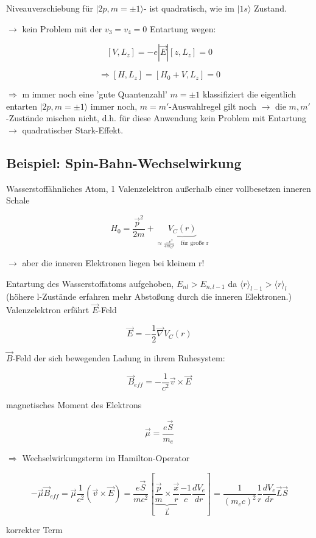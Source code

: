 Niveauverschiebung für \(|2p,m=\pm1\rangle\)- ist quadratisch, wie im \(|1s\rangle\) Zustand.


\(\rightarrow\) kein Problem mit der \(v_3=v_4=0\) Entartung wegen:

\[ [V,L_z] = -e|\vec E| [z,L_z] = 0\]

\[\Rightarrow [H,L_z] = [H_0+V,L_z]=0\]

\(\Rightarrow\) m immer noch eine 'gute Quantenzahl' \(m=\pm 1\) klassifiziert die eigentlich entarten \(|2p,m=\pm 1\rangle\) immer noch, \(m=m'\)-Auswahlregel gilt noch \(\rightarrow\) die \(m,m'\)-Zustände mischen nicht, d.h. für diese Anwendung kein Problem mit Entartung \(\rightarrow\) quadratischer Stark-Effekt.



\subsection{Beispiel: Spin-Bahn-Wechselwirkung}

Wasserstoffähnliches Atom, 1 Valenzelektron außerhalb einer vollbesetzen inneren Schale

\[ H_0= \frac{\vec p^2}{2m} + \underbrace{V_C(r)}_{\approx \frac{-e^2}{4\pi \epsilon_0 r}\quad\text{für große r}}\]

\(\rightarrow\) aber die inneren Elektronen liegen bei kleinem r!

Entartung des Wasserstoffatoms aufgehoben, \(E_{nl}>E_{n,l-1}\) da \(\langle r \rangle_{l-1}> \langle r \rangle_l\) (höhere l-Zustände erfahren mehr Abstoßung durch die inneren Elektronen.) Valenzelektron erfährt \(\vec E\)-Feld

\[ \vec E = -\frac{1}{2}\vec \nabla V_C(r)\]

\(\vec B\)-Feld der sich bewegenden Ladung in ihrem Ruhesystem:

\[ \vec B_{eff} = -\frac{1}{c^2}\vec v\times \vec E\]

magnetisches Moment des Elektrons

\[ \vec\mu = \frac{e \vec S}{m_e}\]

\(\Rightarrow\) Wechselwirkungsterm im Hamilton-Operator

\[ -\vec \mu \vec B_{eff} = \vec \mu \frac{1}{c^2}(\vec v \times \vec E) = \frac{e\vec S}{m c^2}\left[\underbrace{ \frac{\vec p}{m}\times \frac{\vec x}{r}}_{\vec L}\frac{-1}{c}\frac{dV_e}{dr} \right]=\frac{1}{(m_ec)^2}\frac{1}{r}\frac{dV_e}{dr}\vec L \vec S\]

korrekter Term

